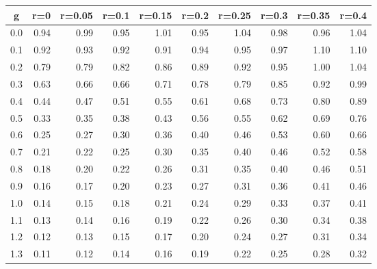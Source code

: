 %
\begin{table}[!tbp]
 \begin{center}
 \begin{tabular}{rrrrrrrrrr}\hline\hline
\multicolumn{1}{c}{g}&\multicolumn{1}{c}{r=0}&\multicolumn{1}{c}{r=0.05}&\multicolumn{1}{c}{r=0.1}&\multicolumn{1}{c}{r=0.15}&\multicolumn{1}{c}{r=0.2}&\multicolumn{1}{c}{r=0.25}&\multicolumn{1}{c}{r=0.3}&\multicolumn{1}{c}{r=0.35}&\multicolumn{1}{c}{r=0.4}\tabularnewline
\hline
0.0&0.94&0.99&0.95&1.01&0.95&1.04&0.98&0.96&1.04\tabularnewline
0.1&0.92&0.93&0.92&0.91&0.94&0.95&0.97&1.10&1.10\tabularnewline
0.2&0.79&0.79&0.82&0.86&0.89&0.92&0.95&1.00&1.04\tabularnewline
0.3&0.63&0.66&0.66&0.71&0.78&0.79&0.85&0.92&0.99\tabularnewline
0.4&0.44&0.47&0.51&0.55&0.61&0.68&0.73&0.80&0.89\tabularnewline
0.5&0.33&0.35&0.38&0.43&0.56&0.55&0.62&0.69&0.76\tabularnewline
0.6&0.25&0.27&0.30&0.36&0.40&0.46&0.53&0.60&0.66\tabularnewline
0.7&0.21&0.22&0.25&0.30&0.35&0.40&0.46&0.52&0.58\tabularnewline
0.8&0.18&0.20&0.22&0.26&0.31&0.35&0.40&0.46&0.51\tabularnewline
0.9&0.16&0.17&0.20&0.23&0.27&0.31&0.36&0.41&0.46\tabularnewline
1.0&0.14&0.15&0.18&0.21&0.24&0.29&0.33&0.37&0.41\tabularnewline
1.1&0.13&0.14&0.16&0.19&0.22&0.26&0.30&0.34&0.38\tabularnewline
1.2&0.12&0.13&0.15&0.17&0.20&0.24&0.27&0.31&0.34\tabularnewline
1.3&0.11&0.12&0.14&0.16&0.19&0.22&0.25&0.28&0.32\tabularnewline
\hline
\end{tabular}

\end{center}

\end{table}


